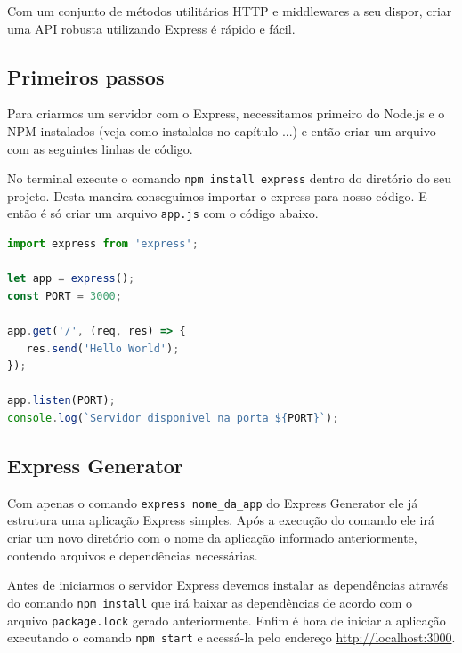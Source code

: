 \documentclass[
	12pt,				%
	openright,			%
	twoside,			%
	a4paper,			%
	english,			%
	brazil				%
	]{abntex2}
\begin{document}
Com um conjunto de métodos utilitários HTTP e middlewares a seu dispor, criar uma API robusta utilizando Express é rápido e fácil.

\subsection {Primeiros passos}

Para criarmos um servidor com o Express, necessitamos primeiro do Node.js e o NPM instalados (veja como instalalos no capítulo ...) e então criar um arquivo com as seguintes linhas de código.

No terminal execute o comando \verb|npm install express| dentro do diretório do seu projeto. Desta maneira conseguimos importar o express para nosso código. E então é só criar um arquivo \verb|app.js| com o código abaixo.

\begin{lstlisting}[language=javascript]
import express from 'express';

let app = express();
const PORT = 3000;

app.get('/', (req, res) => {
   res.send('Hello World');
});

app.listen(PORT);
console.log(`Servidor disponivel na porta ${PORT}`);
\end{lstlisting}

\subsection{Express Generator}

Com apenas o comando \verb|express nome_da_app| do Express Generator ele já estrutura uma aplicação Express simples. Após a execução do comando ele irá criar um novo diretório com o nome da aplicação informado anteriormente, contendo arquivos e dependências necessárias. 

Antes de iniciarmos o servidor Express devemos instalar as dependências através do comando \verb|npm install| que irá baixar as dependências de acordo com o arquivo \verb|package.lock| gerado anteriormente. Enfim é hora de iniciar a aplicação executando o comando \verb|npm start| e acessá-la pelo endereço \href{http://localhost:3000}{http://localhost:3000}.
\end{document}
